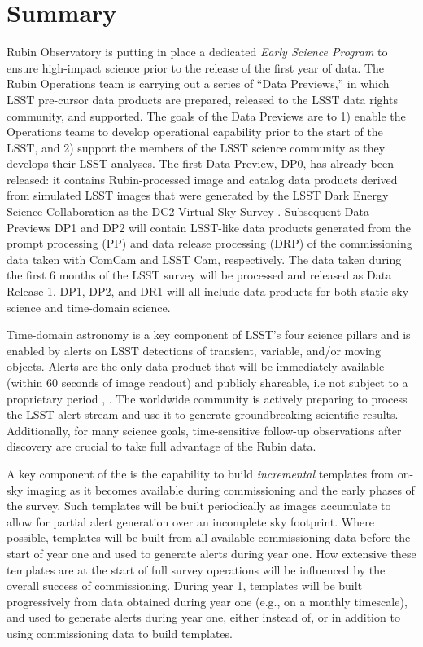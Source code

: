 \section{Summary}

Rubin Observatory is putting in place a dedicated {\it Early Science Program} to ensure high-impact science prior to the release of the first year of \lsst data.
The Rubin Operations team is carrying out a series of ``Data Previews,'' in which LSST pre-cursor data products are prepared, released to the LSST data rights community, and supported.
The goals of the Data Previews are to 1) enable the Operations teams to develop operational capability prior to the start of the LSST, and 2) support the members of the LSST science community as they develops their LSST analyses.
The first Data Preview, DP0, has already been released: it contains Rubin-processed image and catalog data products derived from simulated LSST images that were generated by the LSST Dark Energy Science Collaboration as the DC2 Virtual Sky Survey \citep{DC2}.
Subsequent Data Previews DP1 and DP2 will contain LSST-like data products generated from the prompt processing (PP) and data release processing (DRP) of the commissioning data taken with ComCam and LSST Cam, respectively.
The data taken during the first 6 months of the LSST survey will be processed and released as Data Release 1.
DP1, DP2, and DR1 will all include data products for both static-sky science and time-domain science.

Time-domain astronomy is a key component of LSST's four science pillars and is enabled by alerts on LSST detections of transient, variable, and/or moving objects.
Alerts are the only data product that will be immediately available (within 60 seconds of image readout) and publicly shareable, i.e not subject to a proprietary period \citep{LSE-163},  \citep{RDO-013}.
The worldwide community is actively preparing to process the LSST alert stream and use it to generate groundbreaking scientific results. Additionally, for many science goals, time-sensitive follow-up observations after discovery are crucial to take full advantage of the Rubin data.

A key component of the \esp is the capability to build {\it incremental} templates from on-sky imaging as it becomes available during commissioning and the early phases of the survey.
Such templates will be built periodically as images accumulate to allow for partial alert generation over an incomplete sky footprint.
Where possible, templates will be built from all available commissioning data before the start of year one and used to generate alerts during year one.
How extensive these templates are at the start of full survey operations will be influenced by the overall success of commissioning.
During year 1, templates will be built progressively from data obtained during year one (e.g., on a monthly timescale), and used to generate alerts during year one, either instead of, or in addition to using commissioning data to build templates.
